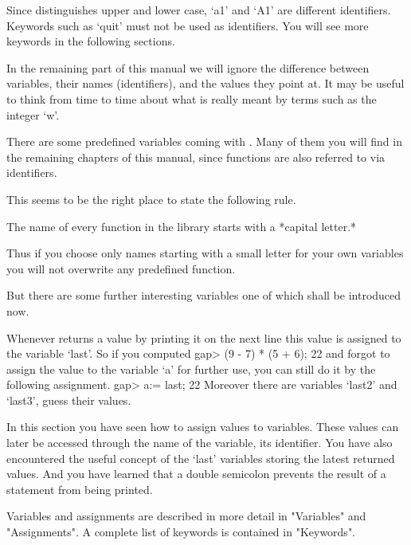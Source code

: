 Since  {\GAP} distinguishes  upper and  lower  case, `a1'  and  `A1'  are
different  identifiers.   Keywords  such as `quit'  must not  be used  as
identifiers.  You will see more keywords in the following sections.

In  the remaining part of  this manual  we  will  ignore  the  difference
between  variables, their names  (identifiers), and the values they point
at.  It  may  be  useful to think from time to time about  what is really
meant by terms such as the integer `w'.

There are some predefined variables coming with {\GAP}.  Many of them you
will find in the remaining  chapters of  this manual, since functions are
also referred to via identifiers.

This seems to be the right place to state the following rule.

The name  of every  function in the {\GAP} library starts with a *capital
letter.*

Thus  if you choose  only names starting with a small letter for your own
variables you will not overwrite any predefined function.

But there are some  further interesting  variables  one of which shall be
introduced now.

Whenever {\GAP} returns   a value by printing  it  on the next line  this
value is assigned to the variable `last'.  So if you computed
\beginexample
    gap> (9 - 7) * (5 + 6);
    22 
\endexample
and forgot to assign the value to the variable  `a' for further use,  you
can still do it by the following assignment.
\beginexample
    gap> a:= last;
    22 
\endexample
Moreover there are variables `last2' and `last3', guess their values.

In  this section you have seen how to assign values to  variables.  These
values  can  later  be accessed through  the  name of the  variable,  its
identifier.  You  have also encountered the useful concept  of the `last'
variables storing the latest returned values.  And  you have learned that
a double semicolon prevents the result of a statement from being printed.

Variables and assignments are described in more detail in "Variables" and
"Assignments".  A complete list of keywords is contained in "Keywords".


